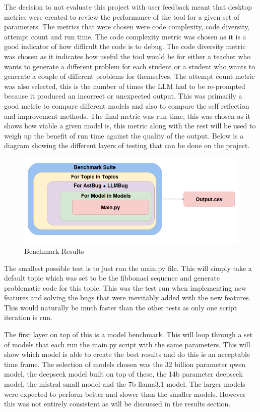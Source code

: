 \documentclass[12pt]{extarticle}
\begin{document}
The decision to not evaluate this project with user feedback meant that desktop metrics were created to review the performance of the tool for a given set of parameters. The metrics that were chosen were code complexity, code diversity, attempt count and run time. The code complexity metric was chosen as it is a good indicator of how difficult the code is to debug. The code diversity metric was chosen as it indicates how useful the tool would be for either a teacher who wants to generate a different problem for each student or a student who wants to generate a couple of different problems for themselves. The attempt count metric was also selected, this is the number of times the LLM had to be re-prompted because it produced an incorrect or unexpected output. This was primarily a good metric to compare different models and also to compare the self reflection and improvement methods. The final metric was run time, this was chosen as it shows how viable a given model is, this metric along with the rest will be used to weigh up the benefit of run time against the quality of the output. Below is a diagram showing the different layers of testing that can be done on the project.

\begin{figure}[H]
\centering
\includegraphics[width=0.7\linewidth]{Images/Benchmark.png}
\caption{Benchmark Results}
\label{fig:benchmark_results}
\end{figure}

The smallest possible test is to just run the main.py file. This will simply take a default topic which was set to be the fibbonaci sequence and generate problematic code for this topic. This was the test run when implementing new features and solving the bugs that were inevitably added with the new features. This would naturally be much faster than the other tests as only one script iteration is run.

The first layer on top of this is a model benchmark. This will loop through a set of models that each run the main.py script with the same parameters. This will show which model is able to create the best results and do this is an acceptable time frame. The selection of models chosen was the 32 billion parameter qwen model, the deepseek model built on top of these, the 14b parameter deepseek model, the mistral small model and the 7b llama3.1 model. The larger models were expected to perform better and slower than the smaller models. However this was not entirely consistent as will be discussed in the results section.
\end{document}
